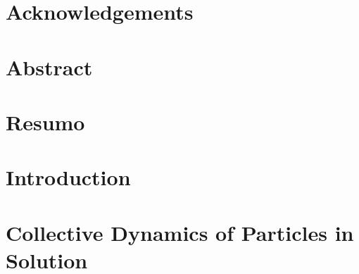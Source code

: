 \documentclass[11pt,a4paper,twoside,openright]{book}
\begin{document}
\begin{sloppy}
%
%
\newpage
\thispagestyle{plain}
\chapter*{Acknowledgements}
    

%
%
\newpage
\thispagestyle{plain}
\chapter*{Abstract}
    


%
%
\newpage
\thispagestyle{plain}
\chapter*{Resumo}
    
%
%
%
%
\newpage
\thispagestyle{plain}
\renewcommand{\contentsname}{Contents}
\tableofcontents
\newpage
\thispagestyle{plain}
\listoffigures
\newpage
\thispagestyle{plain}
\listoftables
\newpage
\thispagestyle{plain}

\thispagestyle{plain}\mbox{}\clearpage
%
%
%
%
%
\newpage
\thispagestyle{plain}
%
\chapter{Introduction}\label{ch:intro}
    
%
%
%
%
\chapter{Collective Dynamics of Particles in Solution}\label{ch: polDynamics}
    
    

\end{sloppy}
\end{document}
